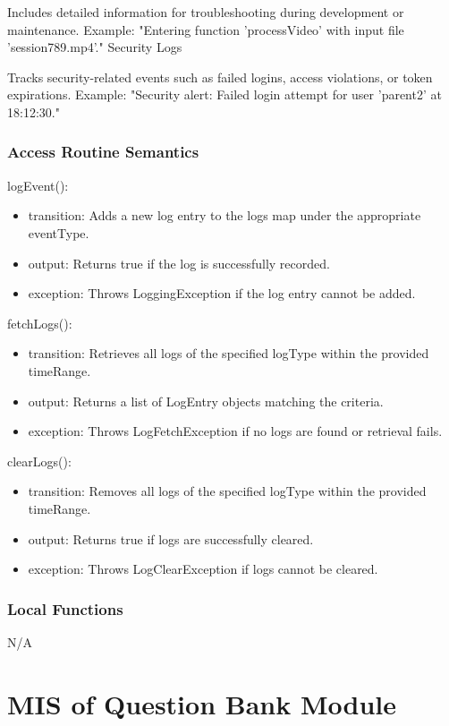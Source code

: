 \documentclass[12pt, titlepage]{article}
\begin{document}
Includes detailed information for troubleshooting during development or maintenance.
Example: "Entering function 'processVideo' with input file 'session789.mp4'."
Security Logs

Tracks security-related events such as failed logins, access violations, or token expirations.
Example: "Security alert: Failed login attempt for user 'parent2' at 18:12:30."
\subsubsection{Access Routine Semantics}

\noindent logEvent():
\begin{itemize}
\item transition: Adds a new log entry to the logs map under the appropriate eventType.
\item output: Returns true if the log is successfully recorded.
\item exception: Throws LoggingException if the log entry cannot be added.
\end{itemize}

\noindent fetchLogs():
\begin{itemize}
\item transition: Retrieves all logs of the specified logType within the provided timeRange.
\item output: Returns a list of LogEntry objects matching the criteria.
\item exception: Throws LogFetchException if no logs are found or retrieval fails.
\end{itemize}

\noindent clearLogs():
\begin{itemize}
\item transition: Removes all logs of the specified logType within the provided timeRange.
\item output: Returns true if logs are successfully cleared.
\item exception: Throws LogClearException if logs cannot be cleared.
\end{itemize}

\subsubsection{Local Functions}
N/A
\section{MIS of Question Bank Module} \label{QuestionBankModule}
\end{document}

